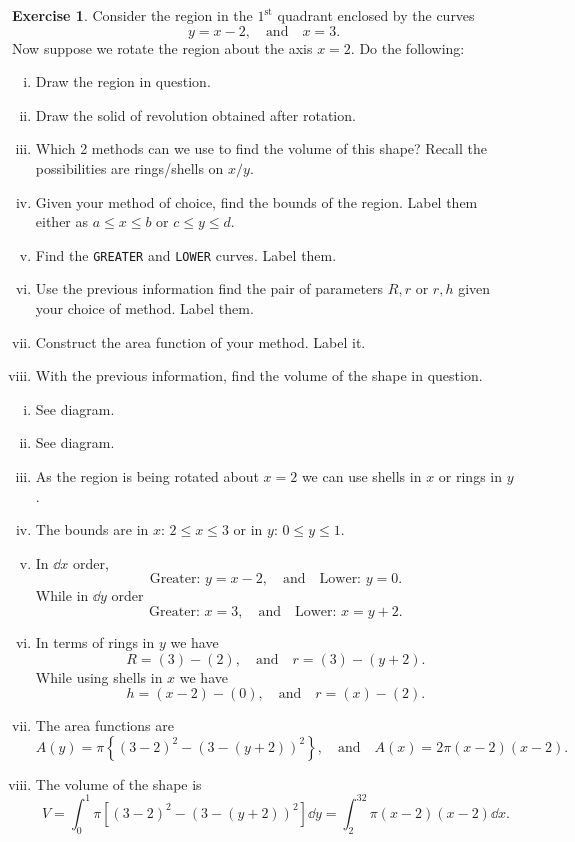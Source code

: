 \documentclass[12pt]{article}
\theoremstyle{plain}
\theoremstyle{definition}
\newtheorem{Ej}[Th]{Exercise}         %
\theoremstyle{remark}
\renewcommand{\leq}{\leqslant}      %
\renewcommand{\:}{\colon}           %
\renewcommand{\.}{\Cdot}                %
\begin{document}
\begin{Ej}
  Consider the region in the $1^{\text{st}}$ quadrant enclosed by the curves
$$y=x-2,\quad\text{and}\quad x=3.$$
  Now suppose we rotate the region about the axis $x=2$. Do the following:
  \begin{enumerate}[i)]
    \itemsep=-0.4em
    \item Draw the region in question.
    \item Draw the solid of revolution obtained after rotation.
    \item Which 2 methods can we use to find the volume of this shape? Recall the possibilities are rings/shells on $x/y$.
    \item Given your method of choice, find the bounds of the region. Label them either as $a\leq x\leq b$ or $c\leq y\leq d$.
    \item Find the \texttt{GREATER} and \texttt{LOWER} curves. Label them.
    \item Use the previous information find the pair of parameters $R,r$ or $r,h$ given your choice of method. Label them.
    \item Construct the area function of your method. Label it.
    \item With the previous information, find the volume of the shape in question.
  \end{enumerate}
\end{Ej}

\begin{ptcb}
  \begin{enumerate}[i)]
    \itemsep=-0.4em 
    \item See diagram.
    \item See diagram.
    \item As the region is being rotated about $x=2$ we can use shells in $x$ or rings in $y$.
    \item The bounds are in $x$: $2\leq x\leq 3$ or in $y$: $0\leq y\leq 1$. 
    \item In $\dd x$ order, 
    $$\text{Greater: }y=x-2,\quad\text{and}\quad\text{Lower: }y=0.$$
    While in $\dd y$ order 
    $$\text{Greater: }x=3,\quad\text{and}\quad\text{Lower: }x=y+2.$$
    \item In terms of rings in $y$ we have 
    $$R=(3)-(2),\quad\text{and}\quad r=(3)-(y+2).$$
    While using shells in $x$ we have 
    $$h=(x-2)-(0),\quad\text{and}\quad r=(x)-(2).$$
    \item The area functions are 
    $$A(y)=\pi\left\lbrace(3-2)^2-(3-(y+2))^2\right\rbrace,\quad\text{and}\quad A(x)=2\pi(x-2)(x-2).$$
    \item The volume of the shape is 
    $$V=\int_0^1\pi\left\lbrack(3-2)^2-(3-(y+2))^2\right\rbrack\dd y=\int_{2}^32\pi(x-2)(x-2)\dd x.$$
  \end{enumerate}
\end{ptcb}

\end{document}
